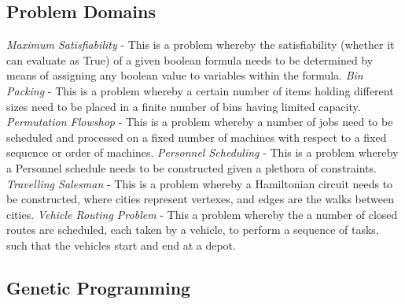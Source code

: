 \documentclass[a4paper,12pt]{article}
\begin{document}
    \subsection{Problem Domains}
        \par{
            \noindent  
            \textit{Maximum Satisfiability} -
            This is a problem whereby the satisfiability (whether it can evaluate as True)
            of a given boolean formula needs to be determined by means of assigning any
            boolean value to variables within the formula.\newline 
            \newline 
            \textit{Bin Packing} -
            This is a problem whereby a certain number of items holding different sizes need
            to be placed in a finite number of bins having limited capacity.\newline 
            \newline
            \textit{Permutation Flowshop} - 
            This is a problem whereby a number of jobs need to be scheduled and processed
            on a fixed number of machines with respect to a fixed sequence or order of
            machines.\newline 
            \newline
            \textit{Personnel Scheduling} - 
            This is a problem whereby a Personnel schedule needs to be constructed given
            a plethora of constraints.\newline 
            \newline
            \textit{Travelling Salesman} - 
            This is a problem whereby a Hamiltonian circuit needs to be constructed, where
            cities represent vertexes, and edges are the walks between cities.\newline 
            \newline
            \textit{Vehicle Routing Problem} -
            This a problem whereby the a number of closed routes are scheduled, each taken
            by a vehicle, to perform a sequence of tasks, such that the vehicles start and
            end at a depot.
        }
    \subsection{Genetic Programming}
\end{document}
